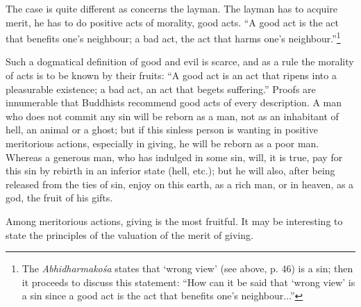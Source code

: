 \documentclass[a4paper, 11pt, oneside, english]{article}
\begin{document}
The case is quite different as concerns the layman. The layman has to acquire merit, he has to do positive acts of morality, good acts. ``A good act is the act that benefits one's neighbour; a bad act, the act that harms one's neighbour.''\footnote{The \emph{Abhidharmakośa} states that `wrong view' (see above, p. 46) is a sin; then it proceeds to discuss this statement: ``How can it be said that `wrong view' is a sin since a good act is the act that benefits one's neighbour...''}

Such a dogmatical definition of good and evil is scarce, and as a rule the morality of acts is to be known by their fruits: ``A good act is an act that ripens into a pleasurable existence; a bad act, an act that begets suffering.'' Proofs are innumerable that Buddhists recommend good acts of every description. A man who does not commit any sin will be reborn as a man, not as an inhabitant of hell, an animal or a ghost; but if this sinless person is wanting in positive meritorious actions, especially in giving, he will be reborn as a poor man. Whereas a generous man, who has indulged in some sin, will, it is true, pay for this sin by rebirth in an inferior state (hell, etc.); but he will also, after being released from the ties of sin, enjoy on this earth, as a rich man, or in heaven, as a god, the fruit of his gifts.

Among meritorious actions, giving is the most fruitful. It may be interesting to state the principles of the valuation of the merit of giving.
\end{document}
